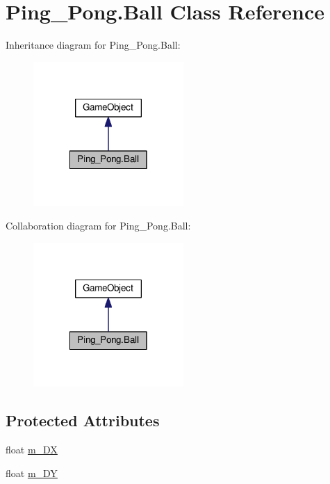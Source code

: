 \hypertarget{class_ping___pong_1_1_ball}{\section{Ping\-\_\-\-Pong.\-Ball Class Reference}
\label{class_ping___pong_1_1_ball}
}


Inheritance diagram for Ping\-\_\-\-Pong.\-Ball\-:
\nopagebreak
\begin{figure}[H]
\begin{center}
\leavevmode
\includegraphics[width=162pt]{class_ping___pong_1_1_ball__inherit__graph}
\end{center}
\end{figure}


Collaboration diagram for Ping\-\_\-\-Pong.\-Ball\-:
\nopagebreak
\begin{figure}[H]
\begin{center}
\leavevmode
\includegraphics[width=162pt]{class_ping___pong_1_1_ball__coll__graph}
\end{center}
\end{figure}
\subsection*{Protected Attributes}
\begin{DoxyCompactItemize}
\item 
float \hyperlink{class_ping___pong_1_1_ball_abc4e830bbb71be51ce46b48cf2bd7df2}{m\-\_\-\-D\-X}
\item 
float \hyperlink{class_ping___pong_1_1_ball_a9b4627b61b519fd2ed089a277403a356}{m\-\_\-\-D\-Y}
\end{DoxyCompactItemize}
